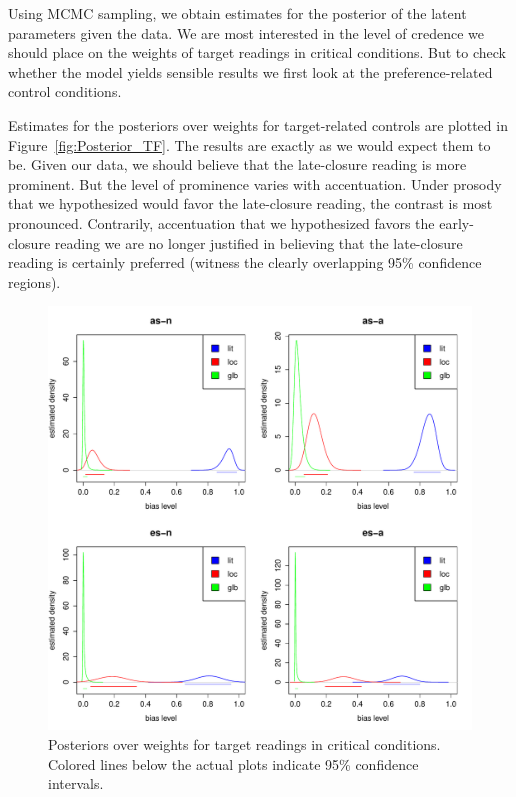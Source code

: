 \documentclass[fleqn,reqno,10pt]{article}
\begin{document}
Using MCMC sampling, we obtain estimates for the posterior of the
latent parameters given the data. We are most interested in the level
of credence we should place on the weights of target readings in
critical conditions. But to check whether the model yields sensible
results we first look at the preference-related control
conditions. 

Estimates for the posteriors over weights for target-related controls
are plotted in Figure~\ref{fig:Posterior_TF}. The results are exactly
as we would expect them to be. Given our data, we should believe that
the late-closure reading is more prominent. But the level of
prominence varies with accentuation. Under prosody that we
hypothesized would favor the late-closure reading, the contrast is
most pronounced. Contrarily, accentuation that we hypothesized favors
the early-closure reading we are no longer justified in believing that
the late-closure reading is certainly preferred (witness the clearly
overlapping 95\% confidence regions).

\begin{figure}
  \centering
  \includegraphics[width=\textwidth]{pics/Posterior_T.pdf}
  \caption{Posteriors over weights for target readings in critical
    conditions. Colored lines below the actual plots indicate 95\%
    confidence intervals.}
  \label{fig:Posterior_T}
\end{figure}
\end{document}
